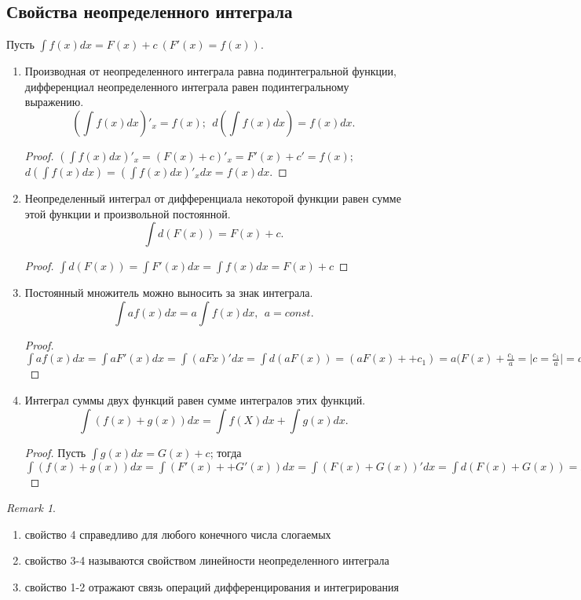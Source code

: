 \documentclass[a4paper,12pt]{article}
\theoremstyle{remark}
\newtheorem*{remark}{Remark}
\begin{document}
\subsection{Свойства неопределенного интеграла}
Пусть $\int f(x)dx=F(x)+c\>(F'(x)=f(x))$.
\begin{enumerate}
	\item Производная от неопределенного интеграла равна подинтегральной функции, дифференциал неопределенного интеграла равен подинтегральному выражению. \\
	$$(\int f(x)dx)'_x=f(x);\>\> d(\int f(x)dx)=f(x)dx.$$
	\begin{proof}
		$(\int f(x)dx)'_x=(F(x)+c)'_x=F'(x)+c'=f(x);$	\\$d(\int f(x)dx)=(\int f(x)dx)'_xdx=f(x)dx$.
	\end{proof}
	\item Неопределенный интеграл от дифференциала некоторой функции равен сумме этой функции и произвольной постоянной.
	$$\int d(F(x))=F(x)+c.$$
	\begin{proof}
		$\int d(F(x))=\int F'(x)dx=\int f(x)dx=F(x)+c$
	\end{proof}
	\item Постоянный множитель можно выносить за знак интеграла.
	$$\int af(x)dx=a\int f(x)dx,\>\> a=const.$$
	\begin{proof}
		$\int af(x)dx=\int a F'(x)dx=\int(aFx)'dx=\int d(aF(x))=(aF(x)++c_1)=a(F(x)+\frac{c_1}{a}=\Big|c=\frac{c_1}{a}\Big|=a(f(x)+c)=a\int f(x)dx$
	\end{proof}
	\item Интеграл суммы двух функций равен сумме интегралов этих функций.
	$$\int(f(x)+g(x))dx=\int f(X)dx+\int g(x)dx.$$
	\begin{proof}
		Пусть $\int g(x)dx=G(x)+c$; тогда $\int(f(x)+g(x))dx=\int(F'(x)++G'(x))dx=\int(F(x)+G(x))'dx=\int d(F(x)+G(x))=F(x)+G(x)++c=\Big|c=c_1+c_2\Big|=(F(x)+c_1)+(G(x)c_2)=\int f(x)dx+\int g(x)dx$
	\end{proof}
\end{enumerate}
\begin{remark}\
	\begin{enumerate}
		\item[-]свойство 4 справедливо для любого конечного числа слогаемых 
		\item[-]свойство 3-4 называются свойством линейности неопределенного интеграла 
		\item[-]свойство 1-2 отражают связь операций дифференцирования и интегрирования  
	\end{enumerate}		
\end{remark}
\end{document}
